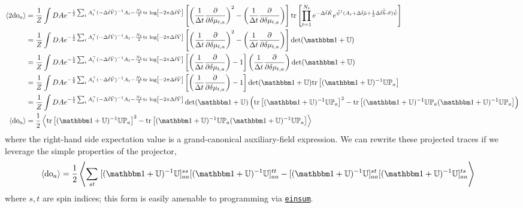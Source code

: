 \begin{align}
    \expectation{2\doubleOccupancy_a}
    &=
    \oneover{Z}\int DA e^{-\frac{1}{2} \sum_t A\transpose_t (-\Delta\tilde{t} \tilde{V})\inverse A_t - \frac{N_t}{2} \trlog{ -2\pi \Delta\tilde{t}\tilde{V}}}
    \left[\left(\oneover{\Delta t}\frac{\partial}{\partial \delta\mu_{t,a}}\right)^2 - \left(\oneover{\Delta t}\frac{\partial}{\partial \delta\mu_{t,a}}\right)\right]\tr{\prod_{t=1}^{N_t} e^{-\Delta \tilde{t}\tilde{K}}  e^{ \tilde{\psi}\adjoint (A_t + \Delta\tilde{t} \tilde{\mu} + \half \Delta\tilde{t} \tilde{\vec{h}}\cdot\vec{\sigma})\tilde{\psi}}}
    \nonumber\\
    &=
    \oneover{Z}\int DA e^{-\frac{1}{2} \sum_t A\transpose_t (-\Delta\tilde{t} \tilde{V})\inverse A_t - \frac{N_t}{2} \trlog{ -2\pi \Delta\tilde{t}\tilde{V}}}
    \left[\left(\oneover{\Delta t}\frac{\partial}{\partial \delta\mu_{t,a}}\right)^2 - \left(\oneover{\Delta t}\frac{\partial}{\partial \delta\mu_{t,a}}\right)\right] \det(\one + \UU)
    \nonumber\\
    &=
    \oneover{Z}\int DA e^{-\frac{1}{2} \sum_t A\transpose_t (-\Delta\tilde{t} \tilde{V})\inverse A_t - \frac{N_t}{2} \trlog{ -2\pi \Delta\tilde{t}\tilde{V}}}
    \left[\left(\oneover{\Delta t}\frac{\partial}{\partial \delta\mu_{t,a}}\right) - 1 \right] \left(\oneover{\Delta t}\frac{\partial}{\partial \delta\mu_{t,a}}\right) \det(\one + \UU)
    \nonumber\\
    &=
    \oneover{Z}\int DA e^{-\frac{1}{2} \sum_t A\transpose_t (-\Delta\tilde{t} \tilde{V})\inverse A_t - \frac{N_t}{2} \trlog{ -2\pi \Delta\tilde{t}\tilde{V}}}
    \left[\left(\oneover{\Delta t}\frac{\partial}{\partial \delta\mu_{t,a}}\right) - 1 \right] \det(\one + \UU) \tr{(\one + \UU)\inverse \UU \PP_a}
    \nonumber\\
    &=
    \oneover{Z}\int DA e^{-\frac{1}{2} \sum_t A\transpose_t (-\Delta\tilde{t} \tilde{V})\inverse A_t - \frac{N_t}{2} \trlog{ -2\pi \Delta\tilde{t}\tilde{V}}}
    \det( \one+\UU ) \left(\tr{(\one + \UU)\inverse \UU \PP_a}^2 - \tr{(\one+\UU)\inverse \UU \PP_a (\one+\UU)\inverse \UU \PP_a}\right)
    \nonumber\\
    \expectation{\doubleOccupancy_a}
    &=
    \half\expectation{\tr{(\one + \UU)\inverse \UU \PP_a}^2 - \tr{(\one+\UU)\inverse \UU \PP_a (\one+\UU)\inverse \UU \PP_a}}
    \label{eq:double occupancy}
\end{align}
where the right-hand side expectation value is a grand-canonical auxiliary-field expression.
We can rewrite these projected traces if we leverage the simple properties of the projector,
\begin{align}
    \expectation{\doubleOccupancy_a}
    &=
    \half\expectation{\sum_{st}\; [(\one + \UU)\inverse \UU]_{aa}^{ss} [(\one + \UU)\inverse \UU]_{aa}^{tt} - [(\one + \UU)\inverse \UU]_{aa}^{st} [(\one + \UU)\inverse \UU]_{aa}^{ts} }
\end{align}
where $s,t$ are spin indices; this form is easily amenable to programming via \href{https://pytorch.org/docs/stable/generated/torch.einsum.html}{\texttt{einsum}}.

